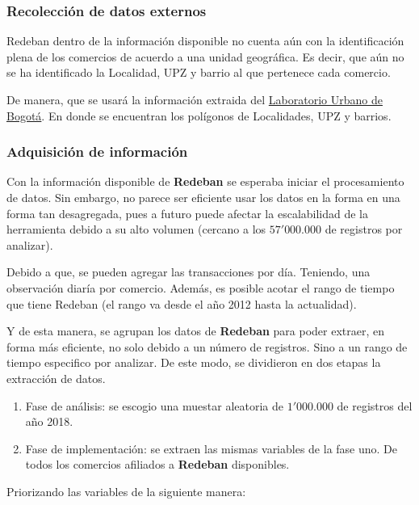 \documentclass[a4paper]{article}
\begin{document}
\subsubsection{Recolección de datos externos}

Redeban dentro de la información disponible no cuenta aún con la identificación plena de los comercios de acuerdo a una unidad geográfica.
Es decir, que aún no se ha identificado la Localidad, UPZ y barrio al que pertenece cada comercio.

De manera, que se usará la información extraida del \href{https://bogota-laburbano.opendatasoft.com/pages/home/?flg=es}{Laboratorio Urbano de Bogotá}. En donde se encuentran los polígonos de Localidades, UPZ y barrios.

\subsubsection{Adquisición de información}

Con la información disponible de \textbf{Redeban} se esperaba iniciar el procesamiento de datos. Sin embargo, no parece ser eficiente
usar los datos en la forma en una forma tan desagregada, pues a futuro puede afectar la escalabilidad de la herramienta
debido a su alto volumen (cercano a los $57'000.000$ de registros por analizar).

Debido a que, se pueden agregar las transacciones por día. Teniendo, una observación diaría por comercio. Además, es posible acotar el rango de tiempo
que tiene Redeban (el rango va desde el año 2012 hasta la actualidad).

Y de esta manera, se agrupan los datos de \textbf{Redeban} para poder extraer, en forma más eficiente, no solo debido a un número de registros.
Sino a un rango de tiempo especifico por analizar. De este modo, se dividieron en dos etapas la extracción de datos.

\begin{enumerate}
	\item Fase de análisis: se escogio una muestar aleatoria de $1'000.000$ de registros del año 2018.
	\item Fase de implementación: se extraen las mismas variables de la fase uno. De todos los comercios afiliados a \textbf{Redeban} disponibles.
\end{enumerate}

Priorizando las variables de la siguiente manera:
\end{document}
